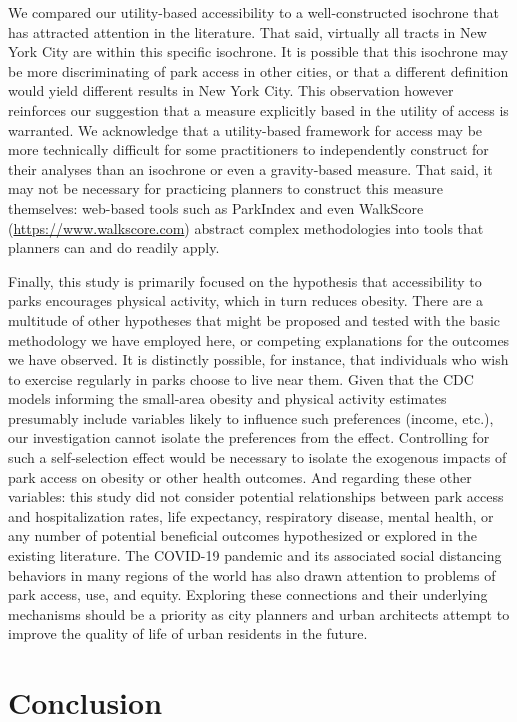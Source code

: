 \documentclass[shortAfour,sageh.bst]{sagej}
\begin{document}
We compared our utility-based accessibility to a well-constructed
isochrone that has attracted attention in the literature. That said,
virtually all tracts in New York City are within this specific
isochrone. It is possible that this isochrone may be more discriminating
of park access in other cities, or that a different definition would
yield different results in New York City. This observation however
reinforces our suggestion that a measure explicitly based in the utility
of access is warranted. We acknowledge that a utility-based framework
for access may be more technically difficult for some practitioners to
independently construct for their analyses than an isochrone or even a
gravity-based measure. That said, it may not be necessary for practicing
planners to construct this measure themselves: web-based tools such as
ParkIndex \citep{Kaczynski2016} and even WalkScore
(\url{https://www.walkscore.com}) abstract complex methodologies into
tools that planners can and do readily apply.

Finally, this study is primarily focused on the hypothesis that
accessibility to parks encourages physical activity, which in turn
reduces obesity. There are a multitude of other hypotheses that might be
proposed and tested with the basic methodology we have employed here, or
competing explanations for the outcomes we have observed. It is
distinctly possible, for instance, that individuals who wish to exercise
regularly in parks choose to live near them. Given that the CDC models
informing the small-area obesity and physical activity estimates
presumably include variables likely to influence such preferences
(income, etc.), our investigation cannot isolate the preferences from
the effect. Controlling for such a self-selection effect would be
necessary to isolate the exogenous impacts of park access on obesity or
other health outcomes. And regarding these other variables: this study
did not consider potential relationships between park access and
hospitalization rates, life expectancy, respiratory disease, mental
health, or any number of potential beneficial outcomes hypothesized or
explored in the existing literature. The COVID-19 pandemic and its
associated social distancing behaviors in many regions of the world has
also drawn attention to problems of park access, use, and equity.
Exploring these connections and their underlying mechanisms should be a
priority as city planners and urban architects attempt to improve the
quality of life of urban residents in the future.

\hypertarget{conclusion}{%
\section{Conclusion}\label{conclusion}}
\end{document}
